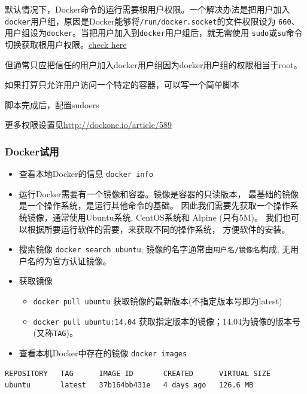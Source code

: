 \documentclass[]{article}
\providecommand{\tightlist}{%
  \setlength{\itemsep}{0pt}\setlength{\parskip}{0pt}}
\numberwithin{figure}{section}
\numberwithin{table}{section}
\begin{document}
默认情况下，Docker命令的运行需要根用户权限。一个解决办法是把用户加入
\texttt{docker}用户组，原因是Docker能够将\texttt{/run/docker.socket}的文件权限设为
\texttt{660}、用户组设为\texttt{docker}。当把用户加入到\texttt{docker}用户组后，就无需使用
\texttt{sudo}或\texttt{su}命令切换获取根用户权限。\href{https://docs.docker.com/engine/installation/linux/ubuntulinux/\#create-a-docker-group}{check here}

但通常只应把信任的用户加入docker用户组因为docker用户组的权限相当于root。

如果打算只允许用户访问一个特定的容器，可以写一个简单脚本

脚本完成后，配置sudoers

更多权限设置见\url{http://dockone.io/article/589}

\hypertarget{docker_try}{%
\subsubsection{Docker试用}\label{docker_try}}

\begin{itemize}
\item
  查看本地Docker的信息 \texttt{docker\ info}
\item
  运行Docker需要有一个镜像和容器。镜像是容器的只读版本，
  最基础的镜像是一个操作系统，是运行其他命令的基础。
  因此我们需要先获取一个操作系统镜像，通常使用Ubuntu系统, CentOS系统和
  Alpine (只有5M)。
  我们也可以根据所要运行软件的需要，来获取不同的操作系统，
  方便软件的安装。
\item
  搜索镜像 \texttt{docker\ search\ ubuntu}; 镜像的名字通常由\texttt{用户名/镜像名}构成,
  无用户名的为官方认证镜像。
\item
  获取镜像

  \begin{itemize}
  \tightlist
  \item
    \texttt{docker\ pull\ ubuntu} 获取镜像的最新版本(不指定版本号即为latest)
  \item
    \texttt{docker\ pull\ ubuntu:14.04} 获取指定版本的镜像；14.04为镜像的版本号(又称\texttt{TAG})。
  \end{itemize}
\item
  查看本机Docker中存在的镜像 \texttt{docker\ images}
\end{itemize}

\begin{verbatim}
REPOSITORY   TAG      IMAGE ID       CREATED      VIRTUAL SIZE
ubuntu       latest   37b164bb431e   4 days ago   126.6 MB
\end{verbatim}
\end{document}

